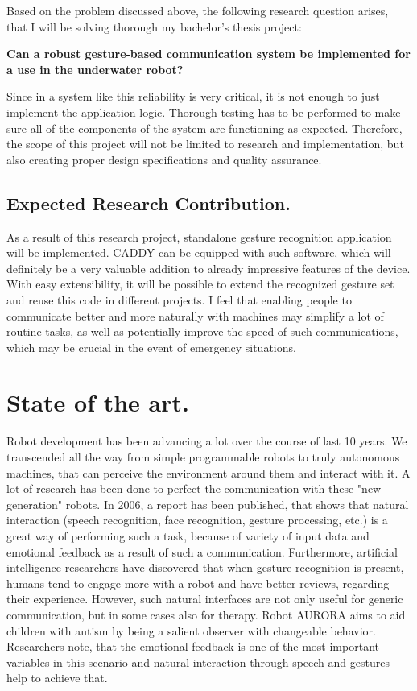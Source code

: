 \documentclass[a4paper,11pt,oneside]{article}
\begin{document}
Based on the problem discussed above, the following research question arises, that I will be solving thorough my bachelor's thesis project:

\textbf{Can a robust gesture-based communication system be implemented for a use in the underwater robot?}

Since in a system like this reliability is very critical, it is not enough to just implement the application logic. Thorough testing has to be performed to make sure all of the components of the system are functioning as expected. Therefore, the scope of this project will not be limited to research and implementation, but also creating proper design specifications and quality assurance.

\subsection{Expected Research Contribution.}

As a result of this research project, standalone gesture recognition application will be implemented. CADDY can be equipped with such software, which will definitely be a very valuable addition to already impressive features of the device. With easy extensibility, it will be possible to extend the recognized gesture set and reuse this code in different projects. I feel that enabling people to communicate better and more naturally with machines may simplify a lot of routine tasks, as well as potentially improve the speed of such communications, which may be crucial in the event of emergency situations.

\section{State of the art.}

Robot development has been advancing a lot over the course of last 10 years. We transcended all the way from simple programmable robots to truly autonomous machines, that can perceive the environment around them and interact with it. A lot of research has been done to perfect the communication with these "new-generation" robots. In 2006, a report \cite{SA01} has been published, that shows that natural interaction (speech recognition, face recognition, gesture processing, etc.) is a great way of performing such a task, because of variety of input data and emotional feedback as a result of such a communication. Furthermore, artificial intelligence researchers \cite{SA02} have discovered that when gesture recognition is present, humans tend to engage more with a robot and have better reviews, regarding their experience. However, such natural interfaces are not only useful for generic communication, but in some cases also for therapy. Robot AURORA \cite{SA03} aims to aid children with autism by being a salient observer with changeable behavior. Researchers note, that the emotional feedback is one of the most important variables in this scenario and natural interaction through speech and gestures help to achieve that.
\end{document}
